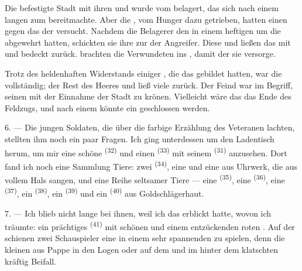 Die befestigte Stadt mit ihren  und  wurde vom
 belagert, das sich nach einem langen
 zum  bereitmachte. Aber die
, vom Hunger dazu getrieben, hatten einen  gegen
das  der  versucht. Nachdem die
 Belagerer den  in einem heftigen
 um die  abgewehrt hatten, schickten sie ihre
 zur  der  Angreifer.
Diese  und ließen das  mit
 und  bedeckt zurück. 
brachten die Verwundeten ins , damit der  sie
versorge.

Trotz des heldenhaften Widerstands einiger , die das
 gebildet hatten, war die  vollständig; der Rest
des Heeres  und ließ viele  zurück. Der Feind war im
Begriff, seinen  mit der Einnahme der Stadt zu krönen. Vielleicht wäre
das das Ende des Feldzugs, und nach einem  könnte ein
 geschlossen werden.

\VUsaut{4.4mm}
\VUsaut{2.8mm}

6. --- Die jungen Soldaten, die über die farbige Erzählung des Veteranen lachten,
stellten ihm noch ein paar Fragen. Ich ging unterdessen um den Ladentisch herum, um
mir eine schöne  \textsuperscript{(32)} und einen 
\textsuperscript{(33)} mit seinem  \textsuperscript{(31)} anzusehen.
Dort fand ich noch eine Sammlung Tiere: zwei 
\textsuperscript{(34)}, eine  und eine  aus
Uhrwerk, die aus vollem Hals sangen, und eine Reihe seltsamer Tiere --- eine
 \textsuperscript{(35)}, eine  \textsuperscript{(36)},
eine  \textsuperscript{(37)}, ein 
\textsuperscript{(38)}, ein  \textsuperscript{(39)} und ein
 \textsuperscript{(40)} aus Goldschlägerhaut.

7. --- Ich blieb nicht lange bei ihnen, weil ich das erblickt hatte, wovon ich
träumte: ein prächtiges  \textsuperscript{(41)} mit schönen
 und einem entzückenden roten . Auf der
 schienen zwei Schauspieler eine  in einem sehr
spannenden  zu spielen, denn die kleinen  aus
Pappe in den Logen oder auf dem  und im
 hinter dem  klatschten kräftig Beifall.

